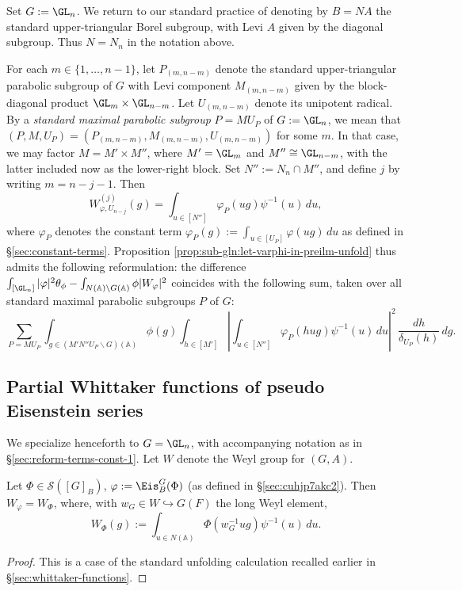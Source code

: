 Set $G := \GL_n$.  We return to our standard practice of denoting by $B = N A$ the standard upper-triangular Borel subgroup, with Levi $A$ given by the diagonal subgroup.  Thus $N = N_n$ in the notation above.

For each $m \in \{1, \dotsc, n-1\}$, let $P_{(m,n-m)}$ denote the standard upper-triangular parabolic subgroup of $G$ with Levi component $M_{(m,n-m)}$ given by the block-diagonal product $\GL_m \times \GL_{n-m}$.  Let $U_{(m,n-m)}$ denote its unipotent radical.  By a \emph{standard maximal parabolic subgroup} $P = M U_P$ of $G := \GL_n$, we mean that $(P,M,U_P) = (P_{(m,n-m)}, M_{(m,n-m)}, U_{(m,n-m)})$ for some $m$.  In that case, we may factor $M = M' \times M''$, where $M' = \GL_m$ and $M'' \cong \GL_{n-m}$, with the latter included now as the lower-right block.  Set $N'' := N_n \cap M''$, and define $j$ by writing $m = n -j - 1$.  Then
\begin{equation*}
  W_{\varphi,U_{n-j}}^{(j)}(g)
  = \int_{u \in [N'']}
  \varphi_{P}(u g) \psi^{-1}(u) \, d u,
\end{equation*}
where $\varphi_P$ denotes the constant term $\varphi_{P}(g) := \int_{u \in [U_P]} \varphi(u g) \, d u$ as defined in \S\ref{sec:constant-terms}.  Proposition \ref{prop:sub-gln:let-varphi-in-preilm-unfold} thus admits the following reformulation: the difference $\int_{[\GL_n]} |\varphi|^2 \theta_\phi - \int_{N(\mathbb{A}) \backslash G(\mathbb{A})} \phi |W_\varphi|^2$ coincides with the following sum, taken over all standard maximal parabolic subgroups $P$ of $G$:
\begin{equation}\label{eq:sum_-p-=}
  \sum_{
    P = M U_P
  }
  \int_{g \in (M' N'' U_P \backslash G)(\mathbb{A})}
  \phi (g)
  \int_{h \in [M']}
  \left\lvert
    \int_{u \in [N'']}
    \varphi_P(h u g) \psi^{-1}(u) \, d u
  \right\rvert^2 \, \frac{d h}{\delta_{U_P}(h)} \, d g.
\end{equation}

\subsection{Partial Whittaker functions of pseudo Eisenstein series}
We specialize henceforth to $G = \GL_n$, with accompanying notation as in \S\ref{sec:reform-terms-const-1}.  Let $W$ denote the Weyl group for $(G,A)$.

\begin{lemma}\label{lem:sub-gln:let-phi-in-eval-W-eis}
  Let $\Phi \in \mathcal{S}([G]_B)$, $\varphi := \Eis_B^G(\Phi)$ (as defined in \S\ref{sec:cuhjp7akc2}).  Then $W_{\varphi} = W_{\Phi}$, where, with $w_G \in W \hookrightarrow G(F)$ the long Weyl element,
  \begin{equation*}
    W_\Phi(g) := \int_{u \in N(\mathbb{A})} \Phi(w_G^{-1} u g) \psi^{-1}(u) \, d u.
  \end{equation*}
\end{lemma}
\begin{proof}
  This is a case of the standard unfolding calculation recalled earlier in \S\ref{sec:whittaker-functions}.
\end{proof}

